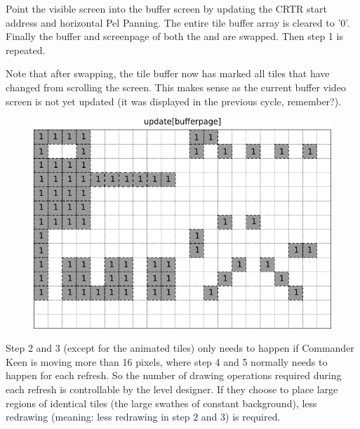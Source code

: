 \documentclass[book.tex]{subfiles}
\begin{document}
\begin{minipage}{.4\textwidth}
Point the visible screen into the buffer screen by updating the CRTR start address and horizontal Pel Panning. The entire tile buffer array is cleared to '0'. Finally the buffer and screenpage of both the  and  are swapped. Then step 1 is repeated. \\
\par
Note that after swapping, the tile buffer now has marked all tiles that have changed from scrolling the screen. This makes sense as the current buffer video screen is not yet updated (it was displayed in the previous cycle, remember?). 
 \end{minipage}
\begin{minipage}{.6\textwidth}
\begin{figure}[H]
  \centering
 \includegraphics[width=.9\textwidth]{screenshots_300dpi/game/Scroll_KC1-3_1-scroll_final.png}
 \label{fig:kc1_3_update_final_img_1}  
\end{figure}
\end{minipage}


\pagebreak

Step 2 and 3 (except for the animated tiles) only needs to happen if Commander Keen is moving more than 16 pixels, where step 4 and 5 normally needs to happen for each refresh.
So the number of drawing operations required during each refresh is controllable by the level designer. If they choose to place large regions of identical tiles (the large swathes of constant background), less redrawing (meaning: less redrawing in step 2 and 3) is required.
\end{document}
